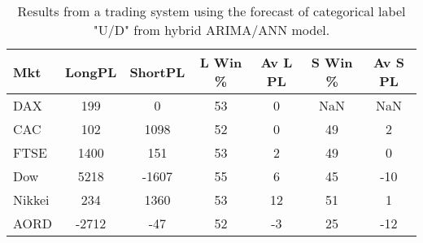 \begin{table}[ht]
\centering
\caption[Results from a trading system using the forecast of categorical label "U/D" from hybrid ARIMA/ANN model]{Results from a trading system using the forecast of categorical label "U/D" from hybrid ARIMA/ANN model.} 
\label{tab:chp_ts:pUD_CAT_arima_ann_sys}
\begin{tabular}{lcccccc}
  \toprule Mkt & LongPL & ShortPL & L Win \% & Av L PL & S Win \% & Av S PL \\ 
  \midrule DAX & 199 & 0 & 53 & 0 & NaN & NaN \\ 
  CAC & 102 & 1098 & 52 & 0 & 49 & 2 \\ 
  FTSE & 1400 & 151 & 53 & 2 & 49 & 0 \\ 
  Dow & 5218 & -1607 & 55 & 6 & 45 & -10 \\ 
  Nikkei & 234 & 1360 & 53 & 12 & 51 & 1 \\ 
  AORD & -2712 & -47 & 52 & -3 & 25 & -12 \\ 
   \bottomrule \end{tabular}
\end{table}
